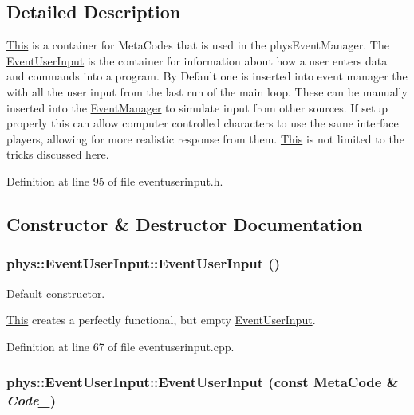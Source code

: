 \subsection{Detailed Description}
\hyperlink{structThis}{This} is a container for MetaCodes that is used in the physEventManager. The \hyperlink{classphys_1_1EventUserInput}{EventUserInput} is the container for information about how a user enters data and commands into a program. By Default one is inserted into event manager the with all the user input from the last run of the main loop. These can be manually inserted into the \hyperlink{classphys_1_1EventManager}{EventManager} to simulate input from other sources. If setup properly this can allow computer controlled characters to use the same interface players, allowing for more realistic response from them. \hyperlink{structThis}{This} is not limited to the tricks discussed here. 

Definition at line 95 of file eventuserinput.h.



\subsection{Constructor \& Destructor Documentation}
\hypertarget{classphys_1_1EventUserInput_ae7358d184021306da8979000c225845e}{
\subsubsection[{EventUserInput}]{\setlength{\rightskip}{0pt plus 5cm}phys::EventUserInput::EventUserInput ()}}
\label{d7/df5/classphys_1_1EventUserInput_ae7358d184021306da8979000c225845e}


Default constructor. 

\hyperlink{structThis}{This} creates a perfectly functional, but empty \hyperlink{classphys_1_1EventUserInput}{EventUserInput}. 

Definition at line 67 of file eventuserinput.cpp.

\hypertarget{classphys_1_1EventUserInput_af54d4604d18b25a2dc99a4a3090b9f1d}{
\subsubsection[{EventUserInput}]{\setlength{\rightskip}{0pt plus 5cm}phys::EventUserInput::EventUserInput (const {\bf MetaCode} \& {\em Code\_\-})}}
\label{d7/df5/classphys_1_1EventUserInput_af54d4604d18b25a2dc99a4a3090b9f1d}


